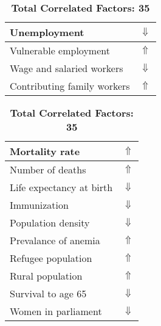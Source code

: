 \documentclass[12pt,notitlepage,oneside]{report}
\begin{document}
\begin{table}[!htb]
\begin{tabular}{|l|l|}
Unemployment & $\Downarrow$\\ \hline
Vulnerable employment & $\Uparrow$\\ \hline
Wage and salaried workers & $\Downarrow$\\ \hline
Contributing family workers & $\Uparrow$\\ \hline
\end{tabular}
\begin{tabular}{|l|l|}
\hline
Mortality rate & $\Uparrow$\\ \hline
Number of deaths & $\Uparrow$\\ \hline
Life expectancy at birth & $\Downarrow$\\ \hline
Immunization & $\Downarrow$\\ \hline
Population density & $\Downarrow$\\ \hline
Prevalance of anemia & $\Uparrow$\\ \hline
Refugee population & $\Uparrow$\\ \hline
Rural population & $\Uparrow$\\ \hline
Survival to age 65 & $\Downarrow$\\ \hline
Women in parliament & $\Downarrow$\\ \hline
\end{tabular}
\caption*{\textbf{Total Correlated Factors: 35}}
\end{table}
\clearpage
\end{document}
